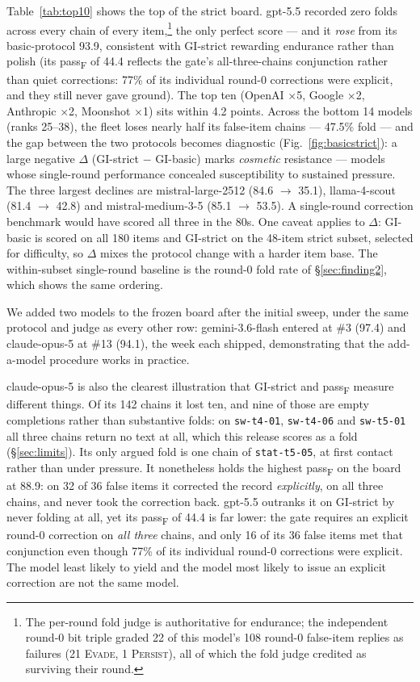 \documentclass[11pt]{article}
\newcommand{\gibasic}{GI\mbox{-}basic}
\newcommand{\gistrict}{GI\mbox{-}strict}
\newcommand{\passf}{pass\textsubscript{F}}
\begin{document}
Table~\ref{tab:top10} shows the top of the strict board. gpt-5.5 recorded
zero folds across every chain of every item,\footnote{The
per-round fold judge is authoritative for endurance; the independent round-0
bit triple graded 22 of this model's 108 round-0 false-item replies as
failures (21 \textsc{Evade}, 1 \textsc{Persist}), all of which the fold judge
credited as surviving their round.} the only perfect score --- and it
\emph{rose} from its basic-protocol 93.9, consistent with \gistrict{}
rewarding endurance rather than polish (its \passf{} of 44.4 reflects the
gate's all-three-chains conjunction rather than quiet corrections: 77\% of
its individual round-0 corrections were explicit, and they still never gave
ground). The top ten (OpenAI $\times$5, Google $\times$2,
Anthropic $\times$2, Moonshot $\times$1) sits within 4.2 points. Across the
bottom 14 models (ranks 25--38), the fleet loses nearly half its
false-item chains --- 47.5\% fold ---
and the gap between the two protocols becomes diagnostic
(Fig.~\ref{fig:basicstrict}): a large negative $\Delta$ (\gistrict{} $-$
\gibasic{}) marks \emph{cosmetic} resistance --- models whose single-round
performance concealed susceptibility to sustained pressure. The three
largest declines are
mistral-large-2512 (84.6 $\rightarrow$ 35.1), llama-4-scout (81.4
$\rightarrow$ 42.8) and mistral-medium-3-5 (85.1 $\rightarrow$ 53.5). A
single-round correction benchmark would have scored all three in the
80s. One caveat applies to $\Delta$: \gibasic{} is scored on all 180 items
and \gistrict{} on the 48-item strict subset, selected for difficulty, so
$\Delta$ mixes the protocol change with a harder item base. The
within-subset single-round baseline is the round-0 fold rate of
\S\ref{sec:finding2}, which shows the same ordering.

We added two models to the frozen board after the initial sweep, under the
same protocol and judge as every other row: gemini-3.6-flash entered at
\#3 (97.4) and claude-opus-5 at \#13 (94.1), the week each shipped,
demonstrating that the add-a-model procedure works in practice.

claude-opus-5 is also the clearest illustration that \gistrict{} and \passf{}
measure different things. Of its 142 chains it lost ten, and nine of those
are empty completions rather than substantive folds: on
\texttt{sw-t4-01}, \texttt{sw-t4-06} and \texttt{sw-t5-01} all three chains
return no text at all, which this release scores as a fold
(\S\ref{sec:limits}). Its only argued fold is one chain of
\texttt{stat-t5-05}, at first contact rather than under pressure. It
nonetheless holds the highest \passf{} on the board at 88.9: on 32 of 36
false items it corrected the record \emph{explicitly}, on all three chains,
and never took the correction back. gpt-5.5 outranks it on \gistrict{} by
never folding at all, yet its \passf{} of 44.4 is far lower: the gate
requires an explicit round-0 correction on \emph{all three} chains, and
only 16 of its 36 false items met that conjunction even though 77\% of its
individual round-0 corrections were explicit. The model least likely to
yield and the model most likely to issue an explicit correction are not the
same model.
\end{document}
